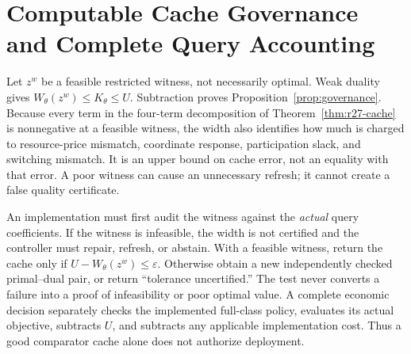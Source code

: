 \section{Computable Cache Governance and Complete Query Accounting}\label{ec:governance}
Let $z^w$ be a feasible restricted witness, not necessarily optimal. Weak duality gives $W_\theta(z^w)\leq K_\theta\leq U$. Subtraction proves Proposition~\ref{prop:governance}. Because every term in the four-term decomposition of Theorem~\ref{thm:r27-cache} is nonnegative at a feasible witness, the width also identifies how much is charged to resource-price mismatch, coordinate response, participation slack, and switching mismatch. It is an upper bound on cache error, not an equality with that error. A poor witness can cause an unnecessary refresh; it cannot create a false quality certificate.

An implementation must first audit the witness against the \emph{actual} query coefficients. If the witness is infeasible, the width is not certified and the controller must repair, refresh, or abstain. With a feasible witness, return the cache only if $U-W_\theta(z^w)\leq\varepsilon$. Otherwise obtain a new independently checked primal--dual pair, or return ``tolerance uncertified.'' The test never converts a failure into a proof of infeasibility or poor optimal value. A complete economic decision separately checks the implemented full-class policy, evaluates its actual objective, subtracts $U$, and subtracts any applicable implementation cost. Thus a good comparator cache alone does not authorize deployment.

